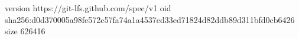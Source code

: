 version https://git-lfs.github.com/spec/v1
oid sha256:d0d370005a98fe572c57fa74a1a4537ed33ed71824d82ddb89d311bfd0cb6426
size 626416
